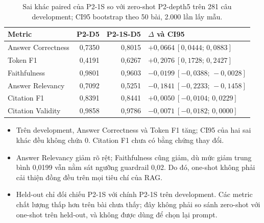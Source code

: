 \begin{table}[H]
  \centering
  \caption{Sai khác paired của P2-1S so với zero-shot P2-depth5 trên 281 câu
  development; CI95 bootstrap theo 50 bài, 2.000 lần lấy mẫu.}
  \label{tab:phase2-one-shot-paired}
  \small
  \begin{tabular}{lrrl}
    \toprule
    \textbf{Metric} & \textbf{P2-D5} & \textbf{P2-1S-D5} & \textbf{$\Delta$ và CI95} \\
    \midrule
    Answer Correctness & 0,7350 & 0,8015 & $+0,0664\ [0,0444;\,0,0883]$ \\
    Token F1 & 0,4191 & 0,6267 & $+0,2076\ [0,1728;\,0,2427]$ \\
    Faithfulness & 0,9801 & 0,9603 & $-0,0199\ [-0,0388;\,-0,0028]$ \\
    Answer Relevancy & 0,7092 & 0,5251 & $-0,1841\ [-0,2233;\,-0,1458]$ \\
    Citation F1 & 0,8391 & 0,8441 & $+0,0050\ [-0,0104;\,0,0229]$ \\
    Citation Validity & 0,9858 & 0,9786 & $-0,0071\ [-0,0182;\,0,0000]$ \\
    \bottomrule
  \end{tabular}
\end{table}

\begin{itemize}
  \item Trên development, Answer Correctness và Token F1 tăng; CI95 của hai
  sai khác đều không chứa 0. Citation F1 chưa có bằng chứng thay đổi.
  \item Answer Relevancy giảm rõ rệt; Faithfulness cũng giảm, dù mức giảm trung
  bình 0,0199 vẫn nằm sát ngưỡng guardrail 0,02. Do đó, one-shot không phải
  cải thiện đồng đều trên mọi tiêu chí của RAG.
  \item Held-out chỉ đối chiếu P2-1S với chính P2-1S trên development. Các
  metric chất lượng thấp hơn trên bài chưa thấy; đây không phải so sánh
  zero-shot với one-shot trên held-out, và không được dùng để chọn lại prompt.
\end{itemize}

